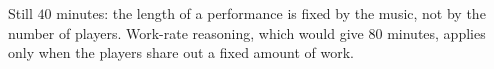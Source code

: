 Still $\boxed{40}$ minutes: the length of a performance is fixed by the music, not by the number of players. Work-rate reasoning, which would give $80$ minutes, applies only when the players share out a fixed amount of work.
